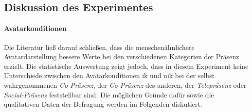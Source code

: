 \documentclass[a4paper,11pt]{article}%
\renewcommand{\\}{\vspace*{0.5\baselineskip} \newline}
\begin{document}
%
%
%
%
%
%

\subsection{Diskussion des Experimentes}
\paragraph{Avatarkonditionen}
Die Literatur ließ darauf schließen, dass die menschenähnlichere Avatardarstellung bessere Werte bei den verschiedenen Kategorien der Präsenz erzielt. Die statistische Auswertung zeigt jedoch, dass in diesem Experiment keine Unterschiede zwischen den Avatarkonditionen \ac{ik} und \ac{nik} bei der selbst wahrgenommenen \textit{Co-Präsenz}, der \textit{Co-Präsenz} des anderen, der \textit{Telepräsenz} oder \textit{Social-Präsenz} feststellbar sind. Die möglichen Gründe dafür sowie die qualitativen Daten der Befragung werden im Folgenden diskutiert.
\end{document}
